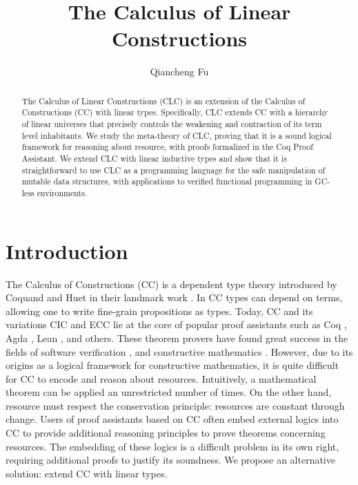 \documentclass{article}
\title{The Calculus of Linear Constructions}
\author{Qiancheng Fu}
\begin{document}
  \maketitle 
  \begin{abstract}
    The Calculus of Linear Constructions (CLC) is an extension of the Calculus of Constructions (CC) with linear types. Specifically, CLC extends CC with a hierarchy of linear universes that precisely controls the weakening and contraction of its term level inhabitants. We study the meta-theory of CLC, proving that it is a sound logical framework for reasoning about resource, with proofs formalized in the Coq Proof Assistant. We extend CLC with linear inductive types and show that it is straightforward to use CLC as a programming language for the safe manipulation of mutable data structures, with applications to verified functional programming in GC-less environments.
  \end{abstract}

  \section{Introduction}
  The Calculus of Constructions (CC) is a dependent type theory introduced by Coquand and Huet in their landmark work \cite{cc}. In CC types can depend on terms, allowing one to write fine-grain propositions as types. Today, CC and its variations CIC \cite{cic} and ECC \cite{ecc} lie at the core of popular proof assistants such as Coq \cite{coq}, Agda \cite{agda}, Lean \cite{lean}, and others. These theorem provers have found great success in the fields of software verification \cite{compcert,bedrock}, and constructive mathematics \cite{four-color,schemes}. However, due to its origins as a logical framework for constructive mathematics, it is quite difficult for CC to encode and reason about resources. Intuitively, a mathematical theorem can be applied an unrestricted number of times. On the other hand, resource must respect the conservation principle: resources are constant through change. Users of proof assistants based on CC often embed external logics into CC to provide additional reasoning principles to prove theorems concerning resources. The embedding of these logics is a difficult problem in its own right, requiring additional proofs to justify its soundness. We propose an alternative solution: extend CC with linear types.
\end{document}
